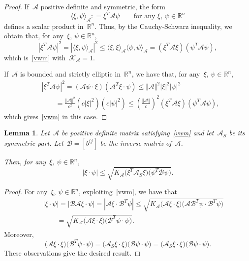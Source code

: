 \documentclass[11pt,hyp,]{nyjm}
\numberwithin{equation}{section}
\newcommand{\R}{\mathbb{R}}
\newtheorem{lemma}[theorem]{Lemma}
\theoremstyle{remark}
\newcommand{\am}{\mathcal{A}}
\renewcommand{\leq}{\leqslant}
\begin{document}
	\begin{proof}
	If~$\mathcal{A}$ positive definite and symmetric, the form
	\begin{equation*}
	\langle \xi, \psi \rangle_{\mathcal{A}}: = \xi^T \mathcal{A} \psi \qquad\mbox{for any~$\xi$, $\psi \in \R^n$}
	\end{equation*}
	defines a scalar product in~$\R^n$. Thus, by the Cauchy-Schwarz inequality, we obtain that, for any~$ \xi$, $\psi \in \R^n$,
	\begin{equation*}
	\left|\xi^T \mathcal{A} \psi\right|^2 = \left|\langle \xi, \psi \rangle_{\mathcal{A}}\right|^2 \leq \langle \xi, \xi \rangle_{\mathcal{A}} \langle \psi, \psi \rangle_{\mathcal{A}} = \left(\xi^T \mathcal{A} \xi\right)\left(\psi^T \mathcal{A} \psi \right),
	\end{equation*}
	which is~\eqref{vwm} with~$\mathcal{K}_{\am} = 1$.
	
	If~$\mathcal{A}$ is bounded and strictly elliptic in~$\R^n$,
	we have that, for any~$ \xi$, $\psi \in \R^n$,
			\begin{equation*}\begin{split}&
				\left|\xi^T \mathcal{A} \psi\right|^2  = (\am \psi \cdot \xi) (\am^T \xi \cdot \psi) \leq \Vert \mathcal{A} \Vert^2 |\xi|^2 |\psi|^2 \\&\qquad= \frac{\Vert \mathcal{A} \Vert^2}{c^2} \left( c|\xi|^2 \right) \left( c |\psi|^2\right) \leq \left( \frac{\Vert \am\Vert}{c} \right)^2 \left(\xi^T \mathcal{A} \xi\right)\left(\psi^T \mathcal{A} \psi \right),\end{split}
			\end{equation*}
			which gives~\eqref{vwm} in this case.
\end{proof}
			
			\begin{lemma}\label{spexx}
			Let~$\mathcal{A}$ be positive definite matrix satisfying~\eqref{vwm} and let~$\mathcal{A}_S$ be its symmetric part.
Let~$\mathcal{B}=[b^{ij}]$ be the inverse matrix of~$\mathcal{A}$.

Then, for any~$\xi$, $\psi \in \R^n$, 
				\[|\xi\cdot \psi| \leq \sqrt{
				K_{\mathcal{A}} \big( \xi^T \mathcal{A}_S \xi \big) \big( 
				\psi^T \mathcal{B} \psi \big)} .\]
			\end{lemma}
			
			\begin{proof}
				For any~$\xi$, $\psi \in \R^n$, exploiting~\eqref{vwm}, we have that	\begin{eqnarray*}&&
|\xi\cdot \psi| = |  \mathcal{B}\mathcal{A}\xi\cdot\psi| = |\mathcal{A}\xi\cdot
\mathcal{B}^T\psi |
\leq \sqrt{K_{\mathcal{A}}\big( \mathcal{A}\xi\cdot\xi\big) \big(
\mathcal{A}\mathcal{B}^T\psi\cdot\mathcal{B}^T\psi\big)} 
\\&&\qquad=   \sqrt{
K_{\mathcal{A}} \big( \mathcal{A}\xi\cdot\xi\big)\big( \mathcal{B}^T\psi\cdot\psi\big)}.
			\end{eqnarray*}	Moreover,
				\[
\big( \mathcal{A}\xi\cdot\xi\big)\big( \mathcal{B}^T\psi\cdot\psi\big)
= \big( \mathcal{A}_S \xi\cdot\xi\big)\big( \mathcal{B}\psi\cdot\psi\big)
= \big( \mathcal{A}_S \xi\cdot\xi\big) \big( \mathcal{B}\psi\cdot\psi\big).\]
These observations give the desired result.
			\end{proof}
\end{document}
